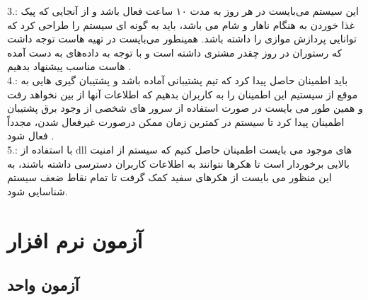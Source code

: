 \documentclass[a4paper, 12pt]{report}
\begin{document}
	3.: این سیستم می‌بایست در هر روز به مدت ۱۰ ساعت فعال باشد و از آنجایی که پیک غذا خوردن به هنگام ناهار و شام می باشد، باید به گونه ای سیستم را طراحی کرد که توانایی پردازش موازی را داشته باشد. همینطور می‌بایست در تهیه هاست توجه داشت که رستوران در روز چقدر مشتری داشته است و با توجه به داده‌های به دست آمده هاست مناسب پیشنهاد بدهیم .\\
	
	4.: باید اطمینان حاصل پیدا کرد که تیم پشتیبانی آماده باشد و پشتیبان گیری هایی به موقع از سیستیم این اطمینان را به کاربران بدهیم که اطلاعات آنها از بین نخواهد رفت و همین طور می بایست در صورت استفاده از سرور های شخصی از وجود برق پشتیبان اطمینان پیدا کرد تا سیستم در کمترین زمان ممکن درصورت غیرفعال شدن، مجدداً فعال شود .\\
	
	5.: با استفاده از dll های موجود می بایست اطمینان حاصل کنیم که سیستم از امنیت بالایی برخوردار است تا هکرها نتوانند به اطلاعات کاربران دسترسی داشته باشند، به این منظور می بایست از هکرهای سفید کمک گرفت تا تمام نقاط ضعف سیستم شناسایی شود.
	
	\chapter{آزمون نرم افزار}
	\section{آزمون واحد}
	
\end{document}
